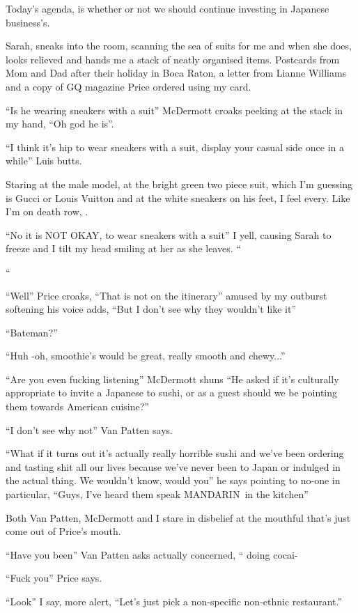 \documentclass[19pt,openany]{book}
\begin{document}
Today's agenda, is whether or not we should continue
investing in Japanese business's.

Sarah, sneaks into the room, scanning the sea of
suits for me and when she does, looks relieved
and hands me a stack of neatly organised items.
Postcards from Mom and Dad after their holiday
in Boca Raton, a letter from Lianne
Williams and a copy
of GQ magazine Price ordered using my card.

``Is he wearing sneakers with a suit'' McDermott
croaks peeking at the
stack in my hand, ``Oh god he is''.

``I think it's hip to wear sneakers with a suit,
display your casual side once in a while''
Luis butts.

Staring at the male model, at the bright green
two piece suit, which I'm guessing is Gucci
or Louis Vuitton and at the white sneakers on his
feet, I feel every. Like I'm on death
row, .


``No it is NOT OKAY, to wear sneakers with a suit''
I yell, causing Sarah to freeze and I tilt my
head smiling at her as she leaves. ``

``




``Well'' Price croaks, ``That is not on the itinerary''
amused by my outburst
softening his voice adds, ``But I don't see why they wouldn't like it''

``Bateman?''

``Huh -oh, smoothie's would be great,
really smooth and chewy...''

``Are you even fucking listening'' McDermott
shuns ``He asked
if it's culturally
appropriate to invite a Japanese to sushi,
or as a guest should we be pointing them towards
American cuisine?''

``I don't see why not'' Van Patten says.

``What if it turns out it's actually
really horrible sushi and we've
been ordering and tasting shit
all our lives because we've never
been to Japan or indulged in the actual thing.
We wouldn't know, would you'' he
says pointing to no-one in particular, ``Guys,
I've heard them speak MANDARIN in the kitchen''

Both Van Patten, McDermott and I
stare in disbelief at the mouthful
that's just come out of Price's mouth.

``Have you been'' Van Patten asks
actually concerned, ``
doing cocai-

``Fuck you'' Price says.

``Look'' I say, more alert, ``Let's just
pick a non-specific non-ethnic restaurant.''
\end{document}
